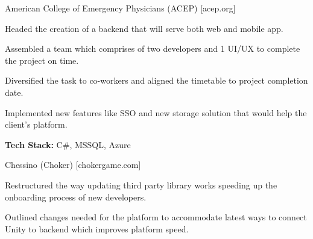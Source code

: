 \begin{cventries}
{\begin{cvitems}
                \item
                    {American College of Emergency Physicians (ACEP) [acep.org]}
                \begin{cvsubitems}
                    \item 
                        {Headed the creation of a backend that will serve both web and mobile app.}
                    \item 
                        {Assembled a team which comprises of two developers and 1 UI/UX to complete the project on time.}
                    \item 
                        {Diversified the task to co-workers and aligned the timetable to project completion date.}
                    \item 
                        {Implemented new features like SSO and new storage solution that would help the client's platform.}
                    \item 
                        {\textbf{Tech Stack:} C\#, MSSQL, Azure}
                \end{cvsubitems}
                \item
                    {Chessino (Choker) [chokergame.com]}
                \begin{cvsubitems}
                    \item 
                        {Restructured the way updating third party library works speeding up the onboarding process of new developers.}
                    \item 
                        {Outlined changes needed for the platform to accommodate latest ways to connect Unity to backend which improves platform speed.}

\end{cvsubitems}
\end{cvitems}}
\end{cventries}
